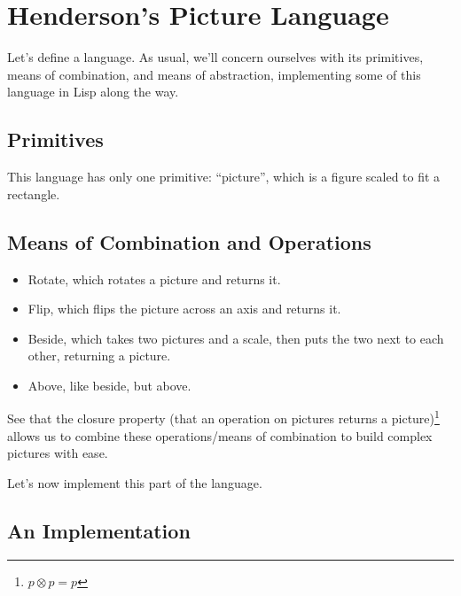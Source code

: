 \documentclass[9pt]{report}
\begin{document}
\section{Henderson's Picture Language}
\label{sec:orgc834d0b}

Let's define a language. As usual, we'll concern ourselves with its
primitives, means of combination, and means of abstraction,
implementing some of this language in Lisp along the way.


\subsection{Primitives}
\label{sec:org8e4f7fd}
This language has only one primitive: ``picture'', which is a figure
scaled to fit a rectangle.


\subsection{Means of Combination and Operations}
\label{sec:org921a529}

\begin{itemize}
\item Rotate, which rotates a picture and returns it.
\item Flip, which flips the picture across an axis and returns it.
\item Beside, which takes two pictures and a scale, then puts the two
next to each other, returning a picture.
\item Above, like beside, but above.
\end{itemize}

See that the closure property (that an operation on pictures
returns a picture)\footnote{\(p \otimes p = p\)} allows us to combine these operations/means of
combination to build complex pictures with ease.

Let's now implement this part of the language.

\subsection{An Implementation}
\label{sec:orgd920556}
\end{document}

